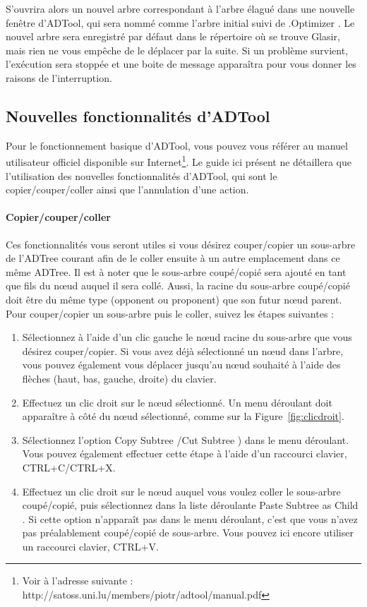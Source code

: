 S'ouvrira alors un nouvel arbre correspondant à l'arbre élagué dans une nouvelle fenêtre d'ADTool, qui sera nommé comme l'arbre initial suivi de \og .Optimizer \fg{}. Le nouvel arbre sera enregistré par défaut dans le répertoire où se trouve Glasir, mais rien ne vous empêche de le déplacer par la suite.
Si un problème survient, l'exécution sera stoppée et une boite de message apparaîtra pour vous donner les raisons de l'interruption.

\subsection{Nouvelles fonctionnalités d'ADTool}
\label{ssec:manuelADTool}

Pour le fonctionnement basique d'ADTool, vous pouvez vous référer au manuel utilisateur officiel disponible sur Internet\footnote{Voir à l'adresse suivante : http://satoss.uni.lu/members/piotr/adtool/manual.pdf}. Le guide ici présent ne détaillera que l'utilisation des nouvelles fonctionnalités d'ADTool, qui sont le copier/couper/coller ainsi que l'annulation d'une action.

\paragraph{Copier/couper/coller} Ces fonctionnalités vous seront utiles si vous désirez couper/copier un sous-arbre de l'ADTree courant afin de le coller ensuite à un autre emplacement dans ce même ADTree. Il est à noter que le sous-arbre coupé/copié sera ajouté en tant que fils du n\oe{}ud auquel il sera collé. Aussi, la racine du sous-arbre coupé/copié doit être du même type (opponent ou proponent) que son futur n\oe{}ud parent. Pour couper/copier un sous-arbre puis le coller, suivez les étapes suivantes : 
\begin{enumerate}
    \item Sélectionnez à l'aide d'un clic gauche le n\oe{}ud racine du sous-arbre que vous désirez couper/copier. Si vous avez déjà sélectionné un n\oe{}ud dans l'arbre, vous pouvez également vous déplacer jusqu'au n\oe{}ud souhaité à l'aide des flèches (haut, bas, gauche, droite) du clavier.
	\item Effectuez un clic droit sur le n\oe{}ud sélectionné. Un menu déroulant doit apparaître à côté du n\oe{}ud sélectionné, comme sur la {\sc Figure}~\ref{fig:clicdroit}.
	\item Sélectionnez l'option \og Copy Subtree \fg{}/\og Cut Subtree \fg{}) dans le menu déroulant. Vous pouvez également effectuer cette étape à l'aide d'un raccourci clavier, {\sc CTRL+C}/{\sc CTRL+X}.
	\item Effectuez un clic droit sur le n\oe{}ud auquel vous voulez coller le sous-arbre coupé/copié, puis sélectionnez dans la liste déroulante \og Paste Subtree as Child \fg{}. Si cette option n'apparaît pas dans le menu déroulant, c'est que vous n'avez pas préalablement coupé/copié de sous-arbre. Vous pouvez ici encore utiliser un raccourci clavier, {\sc CTRL+V}.
\end{enumerate}


